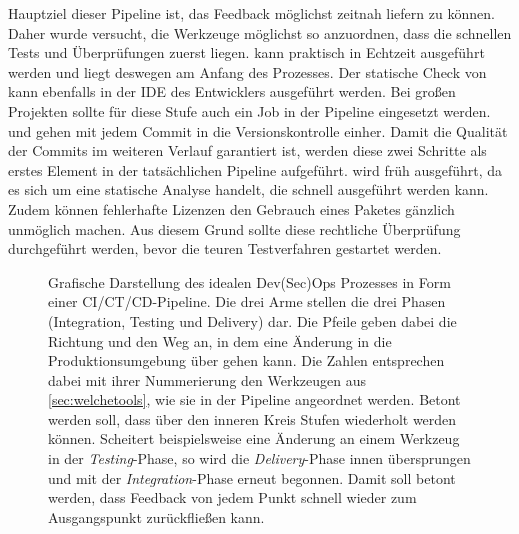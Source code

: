 Hauptziel dieser Pipeline ist, das Feedback möglichst zeitnah liefern zu können. Daher wurde versucht, die Werkzeuge möglichst so anzuordnen, dass die schnellen Tests und Überprüfungen zuerst liegen.  kann praktisch in Echtzeit ausgeführt werden und liegt deswegen am Anfang des Prozesses. Der statische Check von  kann ebenfalls in der IDE des Entwicklers ausgeführt werden. Bei großen Projekten sollte für diese Stufe auch ein Job in der Pipeline eingesetzt werden.  und  gehen mit jedem Commit in die Versionskontrolle einher. Damit die Qualität der Commits im weiteren Verlauf garantiert ist, werden diese zwei Schritte als erstes Element in der tatsächlichen Pipeline aufgeführt. 
 wird früh ausgeführt, da es sich um eine statische Analyse handelt, die schnell ausgeführt werden kann. Zudem können fehlerhafte Lizenzen den Gebrauch eines Paketes gänzlich unmöglich machen. Aus diesem Grund sollte diese rechtliche Überprüfung durchgeführt werden, bevor die \glqq teuren\grqq{} Testverfahren gestartet werden.

\begin{figure}[p]
    \vspace*{1cm}
    \setlength{\abovecaptionskip}{10pt}
    \setlength{\belowcaptionskip}{0pt}
    \centering
    \caption{Grafische Darstellung des \glqq idealen\grqq{} Dev(Sec)Ops Prozesses in Form einer CI/CT/CD-Pipeline. 
    Die drei Arme stellen die drei Phasen (Integration, Testing und Delivery) dar. Die Pfeile geben dabei die Richtung und den Weg an, in dem eine Änderung in die Produktionsumgebung über gehen kann. 
    Die Zahlen entsprechen dabei mit ihrer Nummerierung den Werkzeugen aus \ref{sec:welchetools}, wie sie in der Pipeline angeordnet werden. 
    Betont werden soll, dass über den inneren Kreis Stufen wiederholt werden können. Scheitert beispielsweise eine Änderung an einem Werkzeug in der \emph{Testing}-Phase, so wird die \emph{Delivery}-Phase innen übersprungen und mit der \emph{Integration}-Phase erneut begonnen. 
    Damit soll betont werden, dass Feedback von jedem Punkt schnell wieder zum Ausgangspunkt zurückfließen kann. }
    \label{fig:cicdprocess}
\end{figure}

